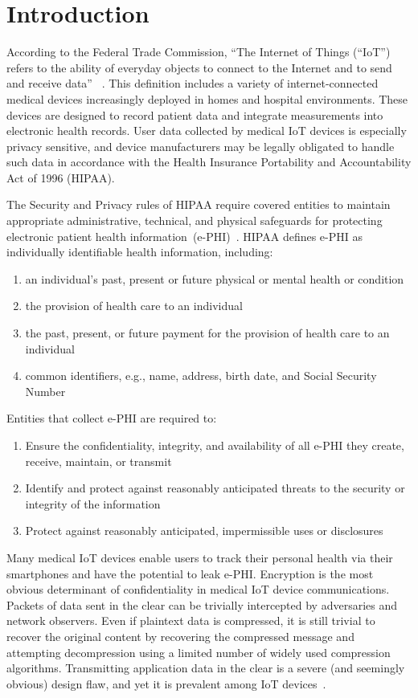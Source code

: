 \section{Introduction}

According to the Federal Trade Commission, ``The Internet of Things (``IoT'') refers to the ability of everyday objects to connect to the Internet and to send and receive data'' ~\cite{ftc}. This definition includes a variety of internet-connected medical devices increasingly deployed in homes and hospital environments. These devices are designed to record patient data and integrate measurements into electronic health records. User data collected by medical IoT devices is especially privacy sensitive, and device manufacturers may be legally obligated to handle such data in accordance with the Health Insurance Portability and Accountability Act of 1996 (HIPAA). 

The Security and Privacy rules of HIPAA require covered entities to maintain appropriate
administrative, technical, and physical safeguards for protecting electronic patient health information~(e-PHI)~\cite{securityHIPAArule, privacyHIPAArule}. HIPAA defines e-PHI as individually identifiable health information, including:
\begin{enumerate}
  \item an individual's past, present or future physical or mental health or condition
  \item the provision of health care to an individual
  \item the past, present, or future payment for the provision of health care to an individual
  \item common identifiers, e.g., name, address, birth date, and  Social Security Number
\end{enumerate}
Entities that collect e-PHI are required to:
\begin{enumerate}
  \item Ensure the confidentiality, integrity, and availability of all e-PHI they create, receive, maintain, or transmit
  \item Identify and protect against reasonably anticipated threats to the security or integrity of the information
  \item Protect against reasonably anticipated, impermissible uses or disclosures
\end{enumerate}
\noindent
Many medical IoT devices enable users to track their personal health via their
smartphones and have the potential to leak e-PHI.  Encryption is the most
obvious determinant of confidentiality in medical IoT device communications.
Packets of data sent in the clear can be trivially intercepted by adversaries
and network observers. Even if plaintext data is compressed, it is still
trivial to recover the original content by recovering the compressed message
and attempting decompression using a limited number of widely used compression
algorithms. Transmitting application data in the clear is a severe (and
seemingly obvious) design flaw, and yet it is prevalent among IoT
devices~\cite{tinker}.

